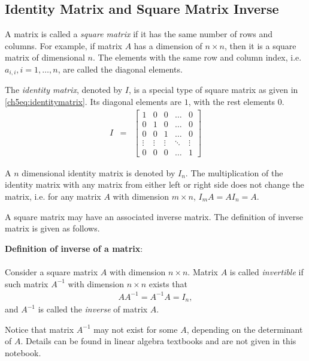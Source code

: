 \subsection{Identity Matrix and Square Matrix Inverse}

A matrix is called a \textit{square matrix} if it has the same number of rows and columns. For example, if matrix $A$ has a dimension of $n\times n$, then it is a square matrix of dimensional $n$. The elements with the same row and column index, i.e. $a_{i,i}, i=1, \ldots, n$, are called the diagonal elements.

The \textit{identity matrix}, denoted by $I$, is a special type of square matrix as given in \eqref{ch5eq:identitymatrix}. Its diagonal elements are $1$, with the rest elements $0$. 
\begin{eqnarray}
    I &=& \left[\begin{array}{ccccc}
        1 & 0 & 0 & \ldots & 0 \\
        0 & 1 & 0 & \ldots & 0 \\
        0 & 0 & 1 & \ldots & 0 \\
        \vdots & \vdots & \vdots & \ddots & \vdots \\
        0 & 0 & 0 & \ldots & 1
    \end{array}\right] \label{ch5eq:identitymatrix}
\end{eqnarray}

A $n$ dimensional identity matrix is denoted by $I_n$. The multiplication of the identity matrix with any matrix from either left or right side does not change the matrix, i.e. for any matrix $A$ with dimension $m\times n$, $I_{m}A = AI_{n}=A$.

A square matrix may have an associated inverse matrix. The definition of inverse matrix is given as follows.

\begin{mdframed}
\textbf{Definition of inverse of a matrix}:
\\
\\
Consider a square matrix $A$ with dimension $n\times n$. Matrix $A$ is called \textit{invertible} if such matrix $A^{-1}$ with dimension $n\times n$ exists that
\begin{eqnarray}
    AA^{-1} = A^{-1}A = I_n, \nonumber
\end{eqnarray}
and $A^{-1}$ is called the \textit{inverse} of matrix $A$.

\end{mdframed}

Notice that matrix $A^{-1}$ may not exist for some $A$, depending on the determinant of $A$. Details can be found in linear algebra textbooks and are not given in this notebook.


